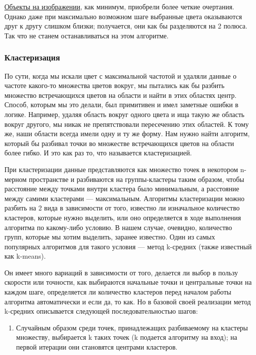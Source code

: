 \documentclass[12pt]{article}
\begin{document}
{	
	
	\hyperref[reduced_with_step_cats]{Объекты на изображении}, как минимум, приобрели более четкие очертания. Однако даже при максимально возможном шаге выбранные цвета оказываются друг к другу слишком близки; получается, они как бы разделяются на 2 полюса. Так что не станем останавливаться на этом алгоритме.
	
	\subsubsection{Кластеризация}
	
	По сути, когда мы искали цвет с максимальной частотой и удаляли данные о частоте какого-то множества цветов вокруг, мы пытались как бы разбить множество встречающихся цветов на области и найти в этих областях центр. Способ, которым мы это делали, был примитивен и имел заметные ошибки в логике. Например, удаляя область вокруг одного цвета и ища такую же область вокруг другого, мы никак не препятствовали пересечению этих областей. К тому же, наши области всегда имели одну и ту же форму. Нам нужно найти алгоритм, который бы разбивал точки во множестве встречающихся цветов на области более гибко. И это как раз то, что называется кластеризацией.
	
	При кластеризации данные представляются как множество точек в некотором n-мерном пространстве и разбиваются на группы-кластеры таким образом, чтобы расстояние между точками внутри кластера было минимальным, а расстояние между самими кластерами --- максимальным. Алгоритмы кластеризации можно разбить на 2 вида в зависимости от того, известно ли изначальное количество кластеров, которые нужно выделить, или оно определяется в ходе выполнения алгоритма по какому-либо условию. В нашем случае, очевидно, количество групп, которые мы хотим выделить, заранее известно. Один из самых популярных алгоритмов для такого условия --- метод k-средних (также известный как k-means).
	
	Он имеет много вариаций в зависимости от того, делается ли выбор в пользу скорости или точности, как выбираются начальные точки и центральные точки на каждом шаге, определяется ли количество кластеров перед началом работы алгоритма автоматически и если да, то как. Но в базовой своей реализации метод k-средних описывается следующей последовательностью шагов:
	
	\begin{enumerate}
	\item Случайным образом среди точек, принадлежащих разбиваемому на кластеры множеству, выбирается k таких точек (k подается алгоритму на вход); на первой итерации они становятся центрами кластеров.
	

\end{enumerate}}
\end{document}
